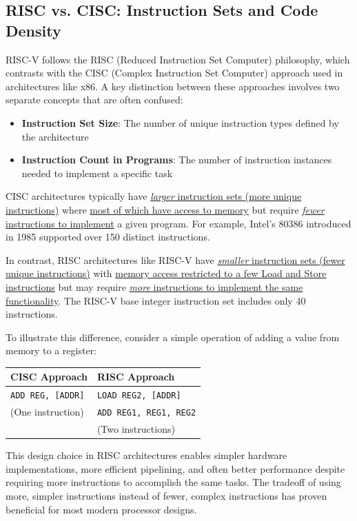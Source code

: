 \documentclass[12pt, a4paper]{article}
\begin{document}
\subsection{RISC vs. CISC: Instruction Sets and Code Density}
RISC-V follows the RISC (Reduced Instruction Set Computer) philosophy, which contrasts with the CISC (Complex Instruction Set Computer) approach used in architectures like x86. A key distinction between these approaches involves two separate concepts that are often confused:

\begin{itemize}
    \item \textbf{Instruction Set Size}: The number of unique instruction types defined by the architecture
    \item \textbf{Instruction Count in Programs}: The number of instruction instances needed to implement a specific task
\end{itemize}

CISC architectures typically have \ul{\textit{larger} instruction sets (more unique instructions)} where \ul{most of which have access to memory} but require \ul{\textit{fewer} instructions to implement} a given program. For example, Intel's 80386 introduced in 1985 supported over 150 distinct instructions.

In contrast, RISC architectures like RISC-V have \ul{\textit{smaller} instruction sets (fewer unique instructions)} with \ul{memory access restricted to a few Load and Store instructions} but may require \ul{\textit{more} instructions to implement the same functionality}. The RISC-V base integer instruction set includes only 40 instructions.

\vspace{1em}
To illustrate this difference, consider a simple operation of adding a value from memory to a register:

\begin{center}
\begin{tabular}{|l|l|}
\hline
\textbf{CISC Approach} & \textbf{RISC Approach} \\
\hline
\texttt{ADD REG, [ADDR]} & \texttt{LOAD REG2, [ADDR]} \\
(One instruction) & \texttt{ADD REG1, REG1, REG2} \\
 & (Two instructions) \\
\hline
\end{tabular}
\end{center}

\vspace{1em}
This design choice in RISC architectures enables simpler hardware implementations, more efficient pipelining, and often better performance despite requiring more instructions to accomplish the same tasks. The tradeoff of using more, simpler instructions instead of fewer, complex instructions has proven beneficial for most modern processor designs.
\end{document}
